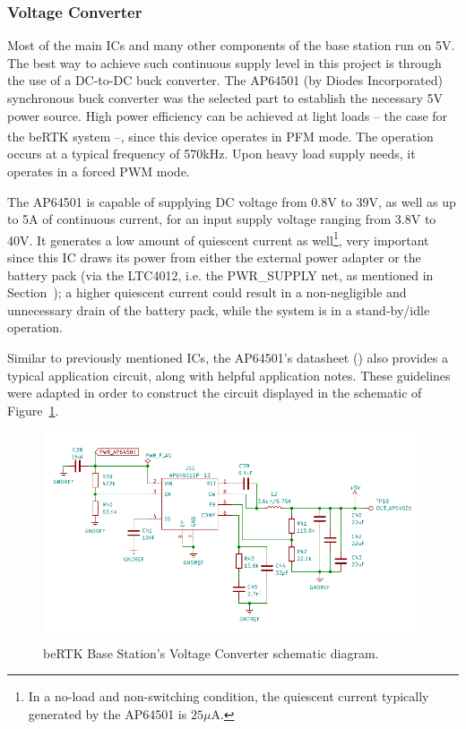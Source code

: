 

\subsubsection{Voltage Converter}\label{sec:3214_AP64501}

Most of the main ICs and many other components of the base station run on 5V. The best way to achieve such continuous supply level in this project is through the use of a DC-to-DC buck converter. The AP64501 (by Diodes Incorporated) synchronous buck converter was the selected part to establish the necessary 5V power source. High power efficiency can be achieved at light loads -- the case for the beRTK\textsuperscript{\textregistered} system --, since this device operates in \gls{PFM} mode. The operation occurs at a typical frequency of 570kHz. Upon heavy load supply needs, it operates in a forced PWM mode.

The AP64501 is capable of supplying DC voltage from 0.8V to 39V, as well as up to 5A of continuous current, for an input supply voltage ranging from 3.8V to 40V. It generates a low amount of quiescent current as well\footnote[11]{In a no-load and non-switching condition, the quiescent current typically generated by the AP64501 is $25 \mu$A.}, very important since this IC draws its power from either the external power adapter or the battery pack (via the LTC4012, i.e. the PWR\_SUPPLY net, as mentioned in Section~\cite{sec:3213_SWITCH}); a higher quiescent current could result in a non-negligible and unnecessary drain of the battery pack, while the system is in a stand-by/idle operation.

Similar to previously mentioned ICs, the AP64501's datasheet (\cite{AP64501}) also provides a typical application circuit, along with helpful application notes. These guidelines were adapted in order to construct the circuit displayed in the schematic of Figure~\ref{fig:AP64501_circuit}.

\begin{figure}[h]
	\centering
	\includegraphics[width=1.0\textwidth]{Chapters/Figures/chapter3/Voltage_Converter.pdf}
	\caption{beRTK\textsuperscript{\textregistered} Base Station's Voltage Converter schematic diagram.}
	\label{fig:AP64501_circuit}
\end{figure}

